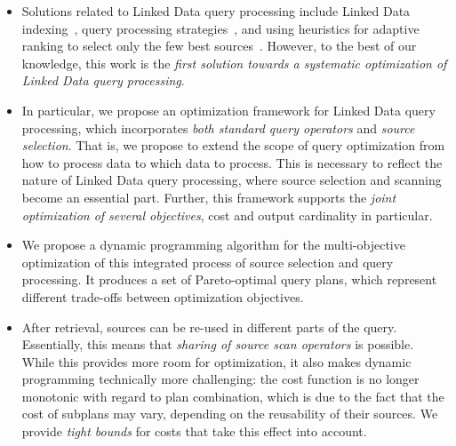 \begin{itemize}
\item Solutions related to Linked Data query processing include Linked
  Data indexing~\cite{harth_data_2010}, query processing
  strategies~\cite{hartig_executing_2009,ladwig_linked_2010}, and
  using heuristics for adaptive ranking to select only the few best
  sources~\cite{ladwig_linked_2010}. However, to the best of our
  knowledge, this work is the \emph{first solution towards a
    systematic optimization of Linked Data query processing}.

\item In particular, we propose an optimization framework for Linked Data query processing, which incorporates
  \emph{both standard query operators} and \emph{source
    selection}. That is, we propose to extend the scope of query
  optimization from how to process data to which data to process. This
  is necessary to reflect the nature of Linked Data query processing,
  where source selection and scanning become an essential
  part. Further, this framework supports the \emph{joint optimization
    of several objectives}, cost and output cardinality in particular.

\item We propose a dynamic programming algorithm for the
  multi-objective optimization of this integrated process of source
  selection and query processing. It produces a set of Pareto-optimal
  query plans, which represent different trade-offs between optimization
  objectives.
  
\item After retrieval, sources can be re-used in different parts of
  the query. Essentially, this means that \emph{sharing of source
    scan operators} is possible. While this provides more room for
  optimization, it also makes dynamic programming technically more
  challenging: the cost function is no longer monotonic with regard to
  plan combination, which is due to the fact that the cost of subplans
  may vary, depending on the reusability of their sources. We provide
  \emph{tight bounds} for costs that take this effect into account.
\end{itemize}




